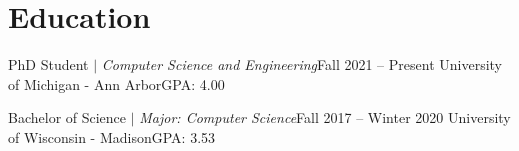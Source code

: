 \section{Education}
  \CVSubHeadingListStart
    \CVSubheading
      {{PhD Student $|$ \emph{\small{Computer Science and Engineering}}}}{Fall 2021 -- Present}
      {University of Michigan - Ann Arbor}{GPA: 4.00}

    \CVSubheading
      {{Bachelor of Science $|$ \emph{\small{Major: Computer Science}}}}{Fall 2017 -- Winter 2020}
      {University of Wisconsin - Madison}{GPA: 3.53}
  \CVSubHeadingListEnd